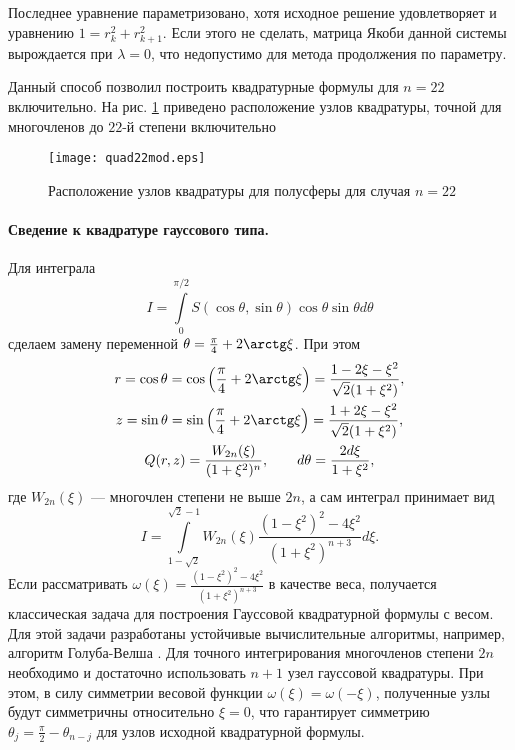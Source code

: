 Последнее уравнение параметризовано, хотя исходное решение удовлетворяет и уравнению $1 = r_{k}^2+r_{k+1}^2$. Если этого не сделать, матрица Якоби
данной системы вырождается при $\lambda = 0$, что недопустимо для метода продолжения по параметру.

Данный способ позволил построить квадратурные формулы для $n = 22$ включительно. На рис. \ref{fig:quad22} приведено расположение узлов квадратуры, точной для многочленов до $22$-й степени включительно
\begin{figure}[ht!]
\centering
\texttt{[image: quad22mod.eps]}
\caption{Расположение узлов квадратуры для полусферы для случая $n = 22$}
\label{fig:quad22}
\end{figure}

\paragraph{Сведение к квадратуре гауссового типа.} Для интеграла
\[
I = \int\limits_0^{\pi/2} S(\cos \theta, \sin \theta) \cos \theta \sin \theta d\theta
\]
сделаем замену переменной $\theta = \frac{\pi}{4} + 2 \arctg \xi$. При этом
\begin{gather*}
r = \cos \theta = \cos \left(\frac{\pi}{4} + 2 \arctg \xi\right) = \frac{1 - 2 \xi - \xi^2}{\sqrt{2}(1 + \xi^2)},\\
z = \sin \theta = \sin \left(\frac{\pi}{4} + 2 \arctg \xi\right) = \frac{1 + 2 \xi - \xi^2}{\sqrt{2}(1 + \xi^2)},\\
Q(r, z) = \frac{W_{2n}(\xi)}{(1 + \xi^2)^n},\qquad d\theta = \frac{2d\xi}{1 + \xi^2},
\end{gather*}
где $W_{2n}(\xi)$ --- многочлен степени не выше $2n$, а сам интеграл принимает вид
\[
I = \int\limits_{1-\sqrt{2}}^{\sqrt{2} - 1}
W_{2n}(\xi) \frac{(1 - \xi^2)^2 - 4\xi^2}{(1 + \xi^2)^{n+3}} d\xi.
\]
Если рассматривать $\omega(\xi) = \frac{(1 - \xi^2)^2 - 4\xi^2}{(1 + \xi^2)^{n+3}} $ в качестве веса, получается классическая задача для построения Гауссовой квадратурной формулы с весом. Для этой задачи разработаны устойчивые вычислительные алгоритмы, например, алгоритм Голуба-Велша \cite{Golub1968}.
Для точного интегрирования многочленов степени $2n$ необходимо и достаточно использовать $n+1$ узел гауссовой квадратуры.
При этом, в силу симметрии весовой функции $\omega(\xi) = \omega(-\xi)$, полученные узлы будут симметричны относительно $\xi = 0$, что гарантирует симметрию $\theta_j = \frac{\pi}{2} - \theta_{n - j}$ для узлов исходной квадратурной формулы.

